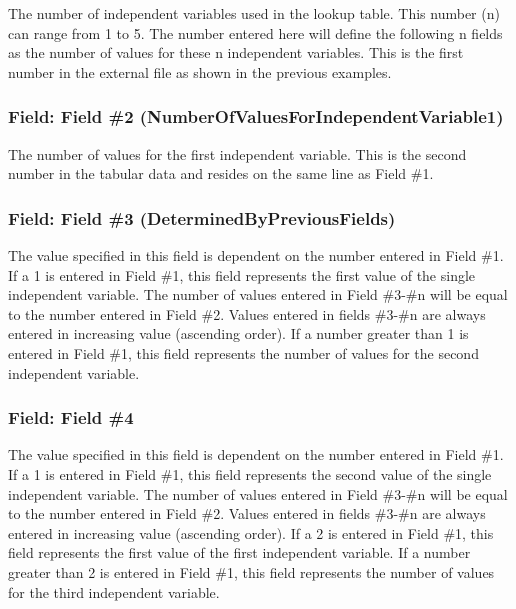 The number of independent variables used in the lookup table. This number (n) can range from 1 to 5. The number entered here will define the following n fields as the number of values for these n independent variables. This is the first number in the external file as shown in the previous examples.

\subsubsection{Field: Field \#2 (NumberOfValuesForIndependentVariable1)}\label{field-field-2-numberofvaluesforindependentvariable1}

The number of values for the first independent variable. This is the second number in the tabular data and resides on the same line as Field \#1.

\subsubsection{Field: Field \#3 (DeterminedByPreviousFields)}\label{field-field-3-determinedbypreviousfields}

The value specified in this field is dependent on the number entered in Field \#1. If a 1 is entered in Field \#1, this field represents the first value of the single independent variable. The number of values entered in Field \#3-\#n will be equal to the number entered in Field \#2. Values entered in fields \#3-\#n are always entered in increasing value (ascending order). If a number greater than 1 is entered in Field \#1, this field represents the number of values for the second independent variable.

\subsubsection{Field: Field \#4}\label{field-field-4}

The value specified in this field is dependent on the number entered in Field \#1. If a 1 is entered in Field \#1, this field represents the second value of the single independent variable. The number of values entered in Field \#3-\#n will be equal to the number entered in Field \#2. Values entered in fields \#3-\#n are always entered in increasing value (ascending order). If a 2 is entered in Field \#1, this field represents the first value of the first independent variable. If a number greater than 2 is entered in Field \#1, this field represents the number of values for the third independent variable.

